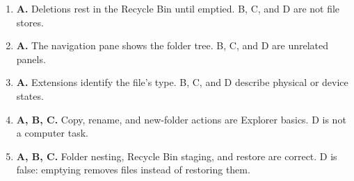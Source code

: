 \documentclass[11pt]{article}
\begin{document}
\begin{enumerate}[label=\textbf{Q\arabic*.}, leftmargin=*]
\item \textbf{A.} Deletions rest in the Recycle Bin until emptied. B, C, and D are not file stores.
\item \textbf{A.} The navigation pane shows the folder tree. B, C, and D are unrelated panels.
\item \textbf{A.} Extensions identify the file's type. B, C, and D describe physical or device states.
\item \textbf{A, B, C.} Copy, rename, and new-folder actions are Explorer basics. D is not a computer task.
\item \textbf{A, B, C.} Folder nesting, Recycle Bin staging, and restore are correct. D is false: emptying removes files instead of restoring them.
\end{enumerate}
\def\JKSSBLessonID{20}\def\JKSSBAnswers{1}
\end{document}
